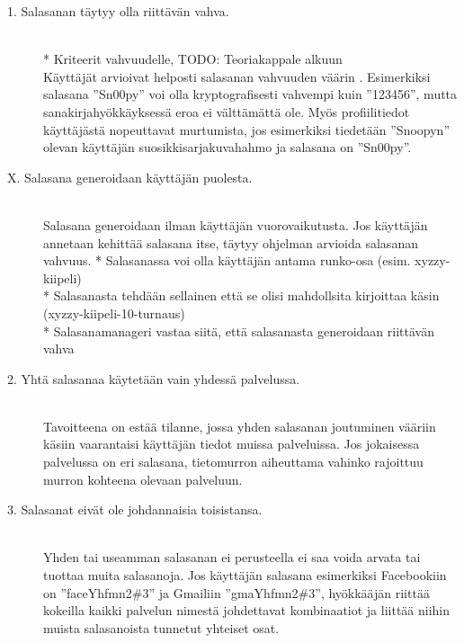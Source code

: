 \documentclass[english,gradu]{tktltiki}
\begin{document}
         \begin{description}

           \item[1. Salasanan täytyy olla riittävän vahva.] \hfill \\
            * Kriteerit vahvuudelle, TODO: Teoriakappale alkuun \\
             Käyttäjät arvioivat helposti salasanan vahvuuden väärin \cite{password_management_strategies_06}.
             Esimerkiksi salasana ''Sn00py'' voi olla kryptografisesti vahvempi kuin ''123456'', mutta
             sanakirjahyökkäyksessä eroa ei välttämättä ole. Myös profiilitiedot käyttäjästä nopeuttavat murtumista, jos
             esimerkiksi tiedetään ''Snoopyn'' olevan käyttäjän suosikkisarjakuvahahmo ja salasana on ''Sn00py''.

           \item[X. Salasana generoidaan käyttäjän puolesta.] \hfill \\
           Salasana generoidaan ilman käyttäjän vuorovaikutusta.
           Jos käyttäjän annetaan kehittää salasana itse, täytyy ohjelman arvioida salasanan vahvuus.
            * Salasanassa voi olla käyttäjän antama runko-osa (esim. xyzzy-kiipeli) \\
            * Salasanasta tehdään sellainen että se olisi mahdollsita kirjoittaa käsin (xyzzy-kiipeli-10-turnaus) \\
            * Salasanamanageri vastaa siitä, että salasanasta generoidaan riittävän vahva \\

           \item[2. Yhtä salasanaa käytetään vain yhdessä palvelussa.] \hfill \\
            Tavoitteena on estää tilanne, jossa yhden salasanan joutuminen vääriin käsiin vaarantaisi käyttäjän tiedot
            muissa palveluissa. Jos jokaisessa palvelussa on eri salasana, tietomurron aiheuttama vahinko rajoittuu
            murron kohteena olevaan palveluun.

           \item[3. Salasanat eivät ole johdannaisia toisistansa.] \hfill \\
             Yhden tai useamman salasanan ei perusteella ei saa voida arvata tai tuottaa muita salasanoja. Jos käyttäjän
             salasana esimerkiksi Facebookiin on ''faceYhfmn2\#3'' ja Gmailiin ''gmaYhfmn2\#3'', hyökkääjän riittää
             kokeilla kaikki palvelun nimestä johdettavat kombinaatiot ja liittää niihin muista salasanoista tunnetut
             yhteiset osat.


\end{description}
\end{document}
